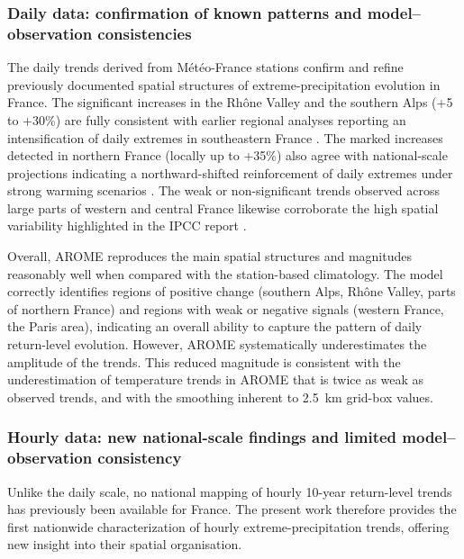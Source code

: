 \documentclass[french,a4paper,DIV=11,numbers=noendperiod]{scrartcl}
\begin{document}
\subsubsection{Daily data: confirmation of known patterns and model–observation consistencies}

The daily trends derived from Météo-France stations confirm and refine previously documented spatial structures of extreme-precipitation evolution in France. The significant increases in the Rhône Valley and the southern Alps (+5 to +30\%) are fully consistent with earlier regional analyses reporting an intensification of daily extremes in southeastern France \parencites{Blanchet2018,blanchet2021explaining,Ribes2019}. The marked increases detected in northern France (locally up to +35\%) also agree with national-scale projections indicating a northward-shifted reinforcement of daily extremes under strong warming scenarios \parencite{soubeyroux:hal-04991790}. The weak or non-significant trends observed across large parts of western and central France likewise corroborate the high spatial variability highlighted in the IPCC report \parencite{IPCC2021}.

Overall, AROME reproduces the main spatial structures and magnitudes reasonably well when compared with the station-based climatology. The model correctly identifies regions of positive change (southern Alps, Rhône Valley, parts of northern France) and regions with weak or negative signals (western France, the Paris area), indicating an overall ability to capture the pattern of daily return-level evolution. However, AROME systematically underestimates the amplitude of the trends. This reduced magnitude is consistent with the underestimation of temperature trends in AROME that is twice as weak as observed trends, and with the smoothing inherent to 2.5~km grid-box values.

\subsubsection{Hourly data: new national-scale findings and limited model–observation consistency}

Unlike the daily scale, no national mapping of hourly 10-year return-level trends has previously been available for France. The present work therefore provides the first nationwide characterization of hourly extreme-precipitation trends, offering new insight into their spatial organisation.
\end{document}

